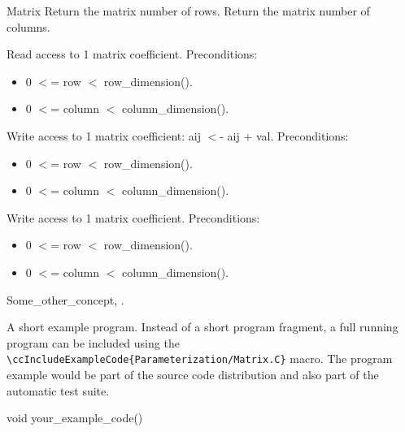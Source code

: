 \begin{ccRefConcept}[SparseLinearAlgebra_d::]{Matrix}
{
Return the matrix number of rows.
}
{
Return the matrix number of columns.
}
{
Read access to 1 matrix coefficient.
Preconditions:\begin{itemize}
\item 0 $<$= row $<$ row\_dimension().\item 0 $<$= column $<$ column\_dimension(). \end{itemize}
}
{
Write access to 1 matrix coefficient: aij $<$- aij + val.
Preconditions:\begin{itemize}
\item 0 $<$= row $<$ row\_dimension().\item 0 $<$= column $<$ column\_dimension(). \end{itemize}
}
{
Write access to 1 matrix coefficient.
Preconditions:\begin{itemize}
\item 0 $<$= row $<$ row\_dimension().\item 0 $<$= column $<$ column\_dimension(). \end{itemize}
}


\ccSeeAlso

Some\_other\_concept,
.

\ccExample

A short example program.
Instead of a short program fragment, a full running program can be
included using the
\verb|\ccIncludeExampleCode{Parameterization/Matrix.C}|
macro. The program example would be part of the source code distribution and
also part of the automatic test suite.

\begin{ccExampleCode}
void your_example_code() {
}
\end{ccExampleCode}


\end{ccRefConcept}


